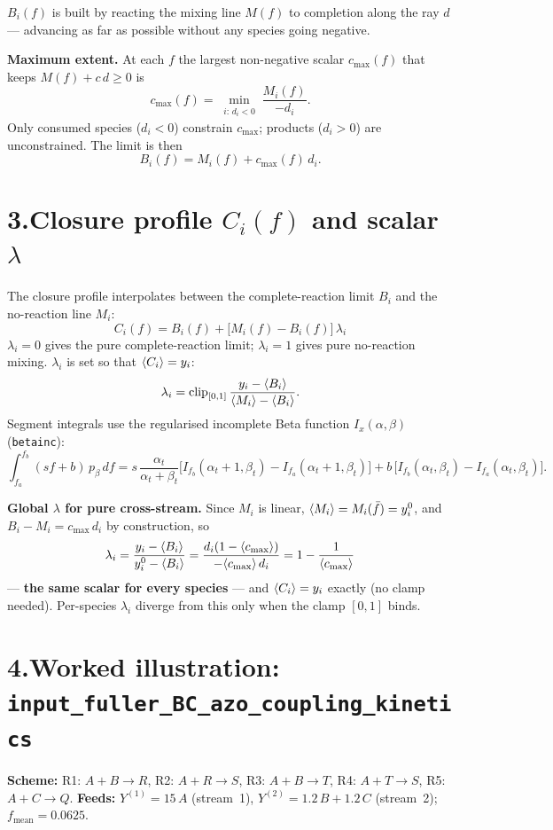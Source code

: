 \documentclass[11pt]{article}
\newcommand{\code}[1]{\texttt{\small #1}}
\DeclarePairedDelimiter{\avg}{\langle}{\rangle}
\begin{document}
\(B_i(f)\) is built by reacting the mixing line \(M(f)\) to completion along the ray \(d\)
--- advancing as far as possible without any species going negative.

\textbf{Maximum extent.} At each \(f\) the largest non-negative scalar \(c_{\max}(f)\)
that keeps \(M(f)+c\,d\ge 0\) is
\[
c_{\max}(f) = \min_{\substack{i:\,d_i<0}}\frac{M_i(f)}{-d_i}.
\]
Only consumed species (\(d_i<0\)) constrain \(c_{\max}\); products (\(d_i>0\)) are
unconstrained. The limit is then
\[
B_i(f) = M_i(f) + c_{\max}(f)\,d_i.
\]

\section*{3.\quad Closure profile \(C_i(f)\) and scalar \(\lambda\)}

The closure profile interpolates between the complete-reaction limit \(B_i\) and the
no-reaction line \(M_i\):
\[
\boxed{\;C_i(f)=B_i(f)+\bigl[M_i(f)-B_i(f)\bigr]\,\lambda_i\;}
\]
\(\lambda_i=0\) gives the pure complete-reaction limit; \(\lambda_i=1\) gives pure
no-reaction mixing. \(\lambda_i\) is set so that \(\avg{C_i}=y_i\):
\[
\lambda_i=\operatorname{clip}_{[0,1]}\frac{y_i-\avg{B_i}}{\avg{M_i}-\avg{B_i}}.
\]
Segment integrals use the regularised incomplete Beta function \(I_x(\alpha,\beta)\)
(\code{betainc}):
\[
\int_{f_a}^{f_b}(sf+b)\,p_\beta\,df
= s\,\frac{\alpha_t}{\alpha_t+\beta_t}
  \bigl[I_{f_b}(\alpha_t{+}1,\beta_t)-I_{f_a}(\alpha_t{+}1,\beta_t)\bigr]
+ b\,\bigl[I_{f_b}(\alpha_t,\beta_t)-I_{f_a}(\alpha_t,\beta_t)\bigr].
\]

\textbf{Global \(\lambda\) for pure cross-stream.} Since \(M_i\) is linear,
\(\avg{M_i}=M_i(\bar{f})=y^0_i\), and \(B_i-M_i=c_{\max}\,d_i\) by construction, so
\[
\lambda_i = \frac{y_i-\avg{B_i}}{y^0_i-\avg{B_i}}
= \frac{d_i(1-\avg{c_{\max}})}{-\avg{c_{\max}}\,d_i}
= 1-\frac{1}{\avg{c_{\max}}}
\]
--- \textbf{the same scalar for every species} --- and \(\avg{C_i}=y_i\) exactly (no
clamp needed). Per-species \(\lambda_i\) diverge from this only when the clamp \([0,1]\)
binds.

\section*{4.\quad Worked illustration: \texttt{input\_fuller\_BC\_azo\_coupling\_kinetics}}

\textbf{Scheme:} R1: \(A{+}B\!\to\!R\), R2: \(A{+}R\!\to\!S\), R3: \(A{+}B\!\to\!T\),
R4: \(A{+}T\!\to\!S\), R5: \(A{+}C\!\to\!Q\).
\textbf{Feeds:} \(Y^{(1)}=15\,A\) (stream~1), \(Y^{(2)}=1.2\,B+1.2\,C\) (stream~2);
\(f_{\mathrm{mean}}=0.0625\).
\end{document}
